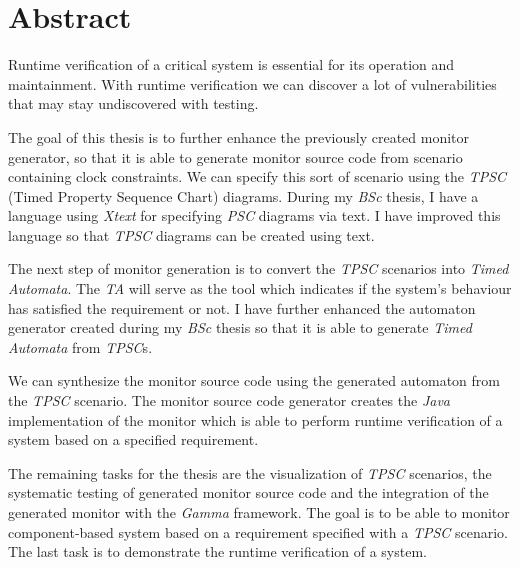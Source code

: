 \chapter*{Abstract}

Runtime verification of a critical system is essential for its operation and maintainment.
With runtime verification we can discover a lot of vulnerabilities that may stay undiscovered with testing.

The goal of this thesis is to further enhance the previously created monitor generator, so that it is able to generate monitor source code from scenario containing clock constraints.
We can specify this sort of scenario using the \textit{TPSC} (Timed Property Sequence Chart) diagrams.
During my \textit{BSc} thesis, I have a language using \textit{Xtext} for specifying \textit{PSC} diagrams via text.
I have improved this language so that \textit{TPSC} diagrams can be created using text.

The next step of monitor generation is to convert the \textit{TPSC} scenarios into \textit{Timed Automata}.
The \textit{TA} will serve as the tool which indicates if the system's behaviour has satisfied the requirement or not.
I have further enhanced the automaton generator created during my \textit{BSc} thesis so that it is able to generate \textit{Timed Automata} from \textit{TPSC}s.

We can synthesize the monitor source code using the generated automaton from the \textit{TPSC} scenario.
The monitor source code generator creates the \textit{Java} implementation of the monitor which is able to perform runtime verification of a system based on a specified requirement.

The remaining tasks for the thesis are the visualization of \textit{TPSC} scenarios, the systematic testing of generated monitor source code and the integration of the generated monitor with the \textit{Gamma} framework.
The goal is to be able to monitor component-based system based on a requirement specified with a \textit{TPSC} scenario.
The last task is to demonstrate the runtime verification of a system.

\vfill
\selectthesislanguage

\setcounter{romanPage}{\value{page}}
